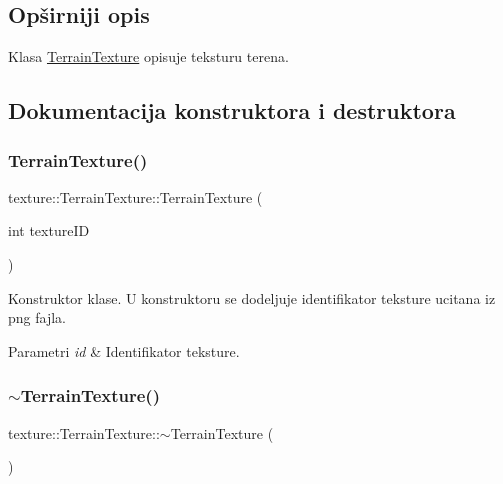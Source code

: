 \subsection{Opširniji opis}
Klasa \hyperlink{classtexture_1_1TerrainTexture}{Terrain\+Texture} opisuje teksturu terena. 

\subsection{Dokumentacija konstruktora i destruktora}
\mbox{\label{classtexture_1_1TerrainTexture_a2aad4f05e7941835c0b9f851a32ee455}} 
\subsubsection{\texorpdfstring{Terrain\+Texture()}{TerrainTexture()}}
{\footnotesize\ttfamily texture\+::\+Terrain\+Texture\+::\+Terrain\+Texture (\begin{DoxyParamCaption}\item[{int}]{texture\+ID }\end{DoxyParamCaption})}



Konstruktor klase. U konstruktoru se dodeljuje identifikator teksture ucitana iz png fajla. 


\begin{DoxyParams}{Parametri}
{\em id} & Identifikator teksture. \\
\hline
\end{DoxyParams}
\mbox{\label{classtexture_1_1TerrainTexture_a461b011cd3b6ee4b48b083c1705d0113}} 
\subsubsection{\texorpdfstring{$\sim$\+Terrain\+Texture()}{~TerrainTexture()}}
{\footnotesize\ttfamily texture\+::\+Terrain\+Texture\+::$\sim$\+Terrain\+Texture (\begin{DoxyParamCaption}{ }\end{DoxyParamCaption})}



